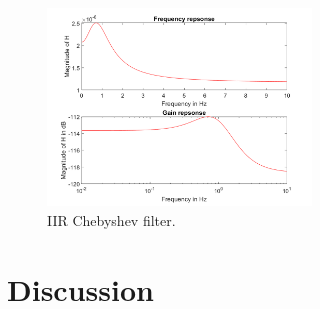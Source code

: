 \documentclass{IEEEtran}
\begin{document}
\begin{figure}[!ht] 
    \centering
    \includegraphics[width = 7cm]{chebyshev.png}
    \caption{IIR Chebyshev filter.}
    \label{fig:chebyshev}
\end{figure}

\section{Discussion}



\end{document}
